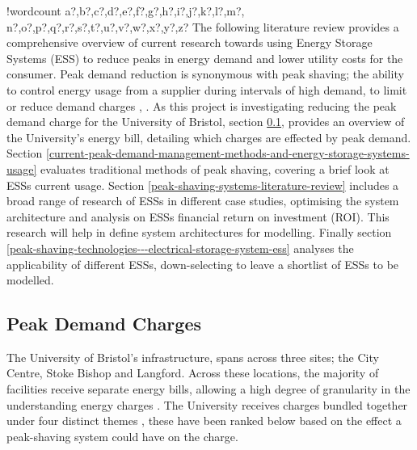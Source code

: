 \documentclass[fontsize=9.5pt]{extarticle}
\numberwithin{figure}{section} %
\newcounter{words}
\newenvironment{counted}{%
  \setcounter{words}{0}
  \SearchList!{wordcount}{\stepcounter{words}}
    {a?,b?,c?,d?,e?,f?,g?,h?,i?,j?,k?,l?,m?,
    n?,o?,p?,q?,r?,s?,t?,u?,v?,w?,x?,y?,z?}
  \UndoBoundary{'}
  \SearchOrder{p;}}{%
  \StopSearching}
\begin{document}
\begin{counted}
The following literature review provides a comprehensive overview of
current research towards using Energy Storage Systems (ESS) to reduce
peaks in energy demand and lower utility costs for the consumer. Peak
demand reduction is synonymous with peak shaving; the ability to control
energy usage from a supplier during intervals of high demand, to limit
or reduce demand charges \cite{schneiderRECPS}, \cite{baldorPS}. As this
project is investigating reducing the peak demand charge for the
University of Bristol, section \ref{peak-demand-charges}, provides an
overview of the University's energy bill, detailing which charges are
effected by peak demand. Section
\ref{current-peak-demand-management-methods-and-energy-storage-systems-usage}
evaluates traditional methods of peak shaving, covering a brief look at
ESSs current usage. Section \ref{peak-shaving-systems-literature-review}
includes a broad range of research of ESSs in different case studies,
optimising the system architecture and analysis on ESSs financial return
on investment (ROI). This research will help in define system
architectures for modelling. Finally section
\ref{peak-shaving-technologies---electrical-storage-system-ess} analyses
the applicability of different ESSs, down-selecting to leave a shortlist
of ESSs to be modelled.

\subsection{Peak Demand Charges}\label{peak-demand-charges}

The University of Bristol's infrastructure, spans across three sites;
the City Centre, Stoke Bishop and Langford. Across these locations, the
majority of facilities receive separate energy bills, allowing a high
degree of granularity in the understanding energy charges
\cite{Jbrentmeet}. The University receives charges bundled together
under four distinct themes \cite{Jbrentmeet}, these have been ranked
below based on the effect a peak-shaving system could have on the
charge.


\end{counted}
\end{document}
